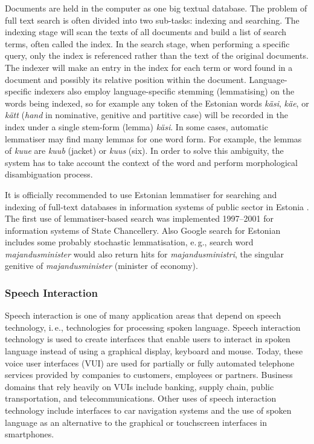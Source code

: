 \begin{multicols}{2}
Documents are held in the computer as one big textual database.  The problem of full text search is often divided into two sub-tasks: indexing and searching.  The indexing stage will scan the texts of all documents and build a list of search terms, often called the index.  In the search stage, when performing a specific query, only the index is referenced rather than the text of the original documents.  The indexer will make an entry in the index for each term or word found in a document and possibly its relative position within the document.  Language-specific indexers also employ language-specific stemming (lemmatising) on the words being indexed, so for example any token of the Estonian words \textit{käsi}, \textit{käe}, or \textit{kätt} (\textit{hand} in nominative, genitive and partitive case) will be recorded in the index under a single stem-form (lemma) \textit{käsi}.  In some cases, automatic lemmatiser may find many lemmas for one word form.  For example, the lemmas of \textit{kuue} are \textit{kuub} (jacket) or \textit{kuus} (six).  In order to solve this ambiguity, the system has to take account the context of the word and perform morphological disambiguation process.
 
It is officially recommended to use Estonian lemmatiser for searching and indexing of full-text databases in information systems of public sector in Estonia \cite{RIA}.  The first use of lemmatiser-based search was implemented 1997--2001 for information systems of State Chancellery.  Also Google search for Estonian includes some probably stochastic lemmatisation, e.\,g., search word \textit{majandusminister} would also return hits for \textit{majandusministri}, the singular genitive of \textit{majandusminister} (minister of economy).

\subsubsection{Speech Interaction}

Speech interaction is one of many application areas that depend on speech technology, i.\,e., technologies for processing spoken language. Speech interaction technology is used to create interfaces that enable users to interact in spoken language instead of using a graphical display, keyboard and mouse.  Today, these voice user interfaces (VUI) are used for partially or fully automated telephone services provided by companies to customers, employees or partners. Business domains that rely heavily on VUIs include banking, supply chain, public transportation, and telecommunications. Other uses of speech interaction technology include interfaces to car navigation systems and the use of spoken language as an alternative to the graphical or touchscreen interfaces in smartphones.


\end{multicols}

